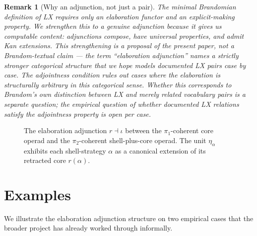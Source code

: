 \documentclass[11pt]{article}
\newtheorem{remark}{Remark}
\begin{document}
\begin{remark}[Why an adjunction, not just a pair]
The minimal Brandomian definition of LX requires only an elaboration
functor and an explicit-making property. We strengthen this to a
genuine adjunction because it gives us \emph{computable} content:
adjunctions compose, have universal properties, and admit Kan
extensions. This strengthening is a proposal of the present paper,
not a Brandom-textual claim --- the term ``elaboration adjunction''
names a strictly stronger categorical structure that we hope models
documented LX pairs case by case. The adjointness condition rules
out cases where the elaboration is structurally arbitrary in
\emph{this categorical sense}. Whether this corresponds to Brandom's
own distinction between LX and merely related vocabulary pairs is a
separate question; the empirical question of whether documented LX
relations satisfy the adjointness property is open per case.
\end{remark}

\begin{figure}[t]
\centering
{}
\caption{The elaboration adjunction $r \dashv \iota$ between the
$\pi_1$-coherent core operad and the $\pi_2$-coherent
shell-plus-core operad. The unit $\eta_\alpha$ exhibits each
shell-strategy $\alpha$ as a canonical extension of its retracted
core $r(\alpha)$.}
\label{fig:lx-adjunction}
\end{figure}

\section{Examples}

We illustrate the elaboration adjunction structure on two empirical cases that
the broader project has already worked through informally.
\end{document}
